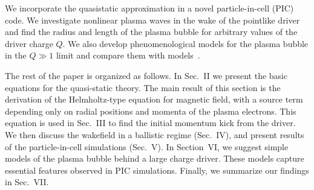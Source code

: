 \documentclass[twocolumn,showpacs,aip]{revtex4}
\begin{document}
We incorporate the quasistatic approximation in a novel  particle-in-cell (PIC) code. We investigate  nonlinear plasma waves in the wake of the pointlike driver and find the   radius and  length of the plasma bubble for arbitrary values of the driver charge $Q$. 
We also develop  phenomenological models for the plasma bubble in the $Q\gg 1$ limit and compare them with  models~\cite{Kostyukov_phenomenological_2004, Lu_theory_2006}.  


The rest of the paper is organized as follows. In Sec.~II we present the basic equations for the  quasi-static theory.
The main result of this section is the derivation of the Helmholtz-type equation for  magnetic field,
with a source term depending only on  radial positions and momenta of the plasma electrons.
 This  equation is used in Sec.~III to find the initial momentum kick from the driver. We then discuss the wakefield in a ballistic regime (Sec.~IV),   
and present results of the particle-in-cell simulations (Sec.~V).
 In Section~VI, we suggest  simple models of the plasma bubble behind a large charge driver. These models capture essential features observed in PIC simulations. Finally,  we summarize our findings  in Sec.~VII.    
%
\end{document}
